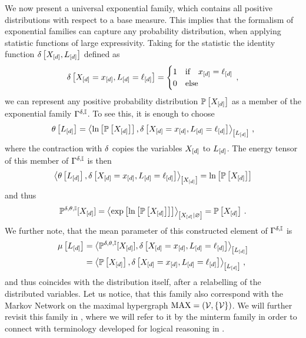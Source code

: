 We now present a universal exponential family, which contains all positive distributions with respect to a base measure.
This implies that the formalism of exponential families can capture any probability distribution, when applying statistic functions of large expressivity.
Taking for the statistic the identity function $\delta\left[X_{[d]},L_{[d]}\right]$ defined as
\begin{align*}
    \delta\left[X_{[d]}=x_{[d]},L_{[d]}=\ell_{[d]}\right]
    = \begin{cases}
          1 & \text{if}\quad x_{[d]} = \ell_{[d]} \\
          0 & \text{else}
    \end{cases} \, ,
\end{align*}
we can represent any positive probability distribution $\mathbb{P}\left[X_{[d]}\right]$ as a member of the exponential family $\Gamma^{\delta,\mathbb{I}}$.
To see this, it is enough to choose
\begin{align*}
    \theta\left[L_{[d]}\right] = \left\langle \ln \left[ \mathbb{P}\left[X_{[d]}\right] \right],\delta\left[X_{[d]}=x_{[d]},L_{[d]}=\ell_{[d]}\right]\right\rangle_{\left[ L_{[d]} \right]} \, ,
\end{align*}
where the contraction with $\delta$ copies the variables $X_{[d]}$ to $L_{[d]}$.
The energy tensor of this member of $\Gamma^{\delta,\mathbb{I}}$ is then
\begin{align*}
    \left\langle \theta\left[L_{[d]}\right],\delta\left[X_{[d]}=x_{[d]},L_{[d]}=\ell_{[d]}\right]\right\rangle_{\left[ X_{[d]} \right]}
    = \ln \left[ \mathbb{P}\left[X_{[d]}\right] \right]
\end{align*}
and thus
\begin{align*}
    \mathbb{P}^{\delta,\theta,\mathbb{I}}[X_{[d]}] = \left\langle \mathrm{exp}\left[\ln \left[ \mathbb{P}\left[X_{[d]}\right] \right]\right]\right\rangle_{\left[ X_{[d]} | \varnothing \right]} = \mathbb{P}\left[X_{[d]}\right] \, .
\end{align*}
We further note, that the mean parameter of this constructed element of $\Gamma^{\delta,\mathbb{I}}$ is
\begin{align*}
    \mu\left[L_{[d]}\right]
    &= \left\langle \mathbb{P}^{\delta,\theta,\mathbb{I}}[X_{[d]}],\delta\left[X_{[d]}=x_{[d]},L_{[d]}=\ell_{[d]}\right]\right\rangle_{\left[ L_{[d]} \right]}\\
    &= \left\langle \mathbb{P}\left[X_{[d]}\right],\delta\left[X_{[d]}=x_{[d]},L_{[d]}=\ell_{[d]}\right]\right\rangle_{\left[ L_{[d]} \right]} \, ,
\end{align*}
and thus coincides with the distribution itself, after a relabelling of the distributed variables.
Let us notice, that this family also correspond with the Markov Network on the maximal hypergraph $\mathrm{MAX}=(\mathcal{V},\{\mathcal{V}\})$.
We will further revisit this family in , where we will refer to it by the minterm family in order to connect with terminology developed for logical reasoning in .



